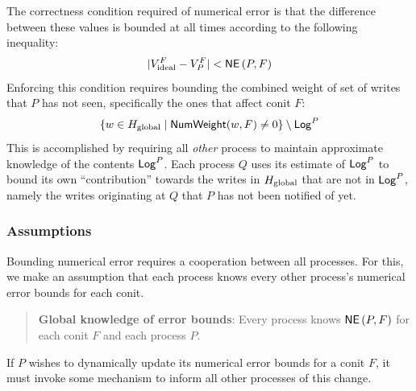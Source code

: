 \documentclass[]             %
{NASA}                       %
\theoremstyle{definition}
\begin{document}
The correctness condition required of numerical error is that the
difference between these values is bounded at all times according to
the following inequality:
\begin{equation}
  | V^{F}_{\textrm{ideal}} - V^{F}_{P} | < \mathsf{NE}\left(P, F \right)
\end{equation}
Enforcing this condition requires bounding the combined weight of set
of writes that $P$ has not seen, specifically the ones that affect
conit $F$:
\[
  \{ w \in H_\mathrm{global} \mid \mathsf{NumWeight}(w, F) \neq 0 \} \setminus \mathsf{Log}^{P}
\]
This is accomplished by requiring all \emph{other} process to maintain
approximate knowledge of the contents $\mathsf{Log}^{P}$. Each process $Q$
uses its estimate of $\mathsf{Log}^{P}$ to bound its own ``contribution''
towards the writes in $H_\mathrm{global}$ that are not in $\mathsf{Log}^{P}$, namely the
writes originating at $Q$ that $P$ has not been notified of yet.

\subsubsection{Assumptions}
\label{sssec:conit-numerical-assumptions}

Bounding numerical error requires a cooperation between all
processes. For this, we make an assumption that each process knows
every other process's numerical error bounds for each conit.
\begin{quote}
  \textbf{Global knowledge of error bounds}: Every process knows
  $\mathsf{NE}\left(P, F \right)$ for each conit $F$ and each process $P$.
\end{quote}
If $P$ wishes to dynamically update its numerical error bounds for a
conit $F$, it must invoke some mechanism to inform all other processes
of this change.
\end{document}
